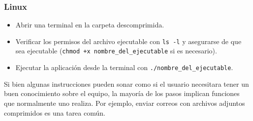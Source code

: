 \subsubsection*{Linux}

\begin{itemize}
    \item Abrir una terminal en la carpeta descomprimida.
    \item Verificar los permisos del archivo ejecutable con \verb|ls -l| y asegurarse de que sea ejecutable (\verb|chmod +x nombre_del_ejecutable| si es necesario).
    \item Ejecutar la aplicación desde la terminal con \verb|./nombre_del_ejecutable|.
\end{itemize}

Si bien algunas instrucciones pueden sonar como si el usuario necesitara tener un buen conocimiento sobre el equipo, la mayoría de los pasos implican funciones que normalmente uno realiza. Por ejemplo, enviar correos con archivos adjuntos comprimidos es una tarea común.